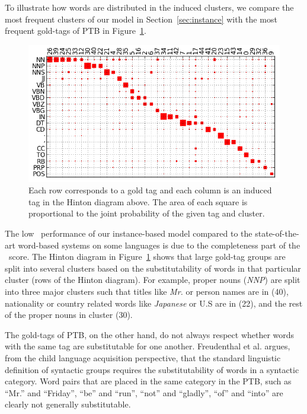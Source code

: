 To illustrate how words are distributed in the induced clusters, we
compare the most frequent clusters of our model in Section~\ref{sec:instance}
with the most frequent gold-tags of PTB in Figure~\ref{plot-hinton}.  
\begin{figure}[h] \centering
\includegraphics[width=1\columnwidth]{hinton.png}
\caption{Each row corresponds to a gold tag and each column is an
  induced tag in the Hinton diagram above.  The area of each square is
  proportional to the joint probability of the given tag and cluster.
}
  \label{plot-hinton}
\end{figure}

The low \vm\ performance of our instance-based model compared to the
state-of-the-art word-based systems on some languages is due to the
completeness part of the \vm\ score.  The Hinton diagram in
Figure~\ref{plot-hinton} shows that large gold-tag groups are split
into several clusters based on the substitutability of words in that
particular cluster (rows of the Hinton diagram).  For example, proper
nouns ({\em NNP}) are split into three major clusters such that titles
like {\em Mr.} or person names are in (40), nationality or country
related words like {\em Japanese} or {U.S} are in (22), and the rest
of the proper nouns in cluster (30).

The gold-tags of PTB, on the other hand, do not always respect whether
words with the same tag are substitutable for one another.
Freudenthal et al.   argues, from
the child language acquisition perspective, that the standard
linguistic definition of syntactic groups requires the
substitutability of words in a syntactic category.  Word pairs that
are placed in the same category in the PTB, such as ``Mr.'' and
``Friday'', ``be'' and ``run'', ``not'' and ``gladly'', ``of'' and
``into'' are clearly not generally substitutable.

